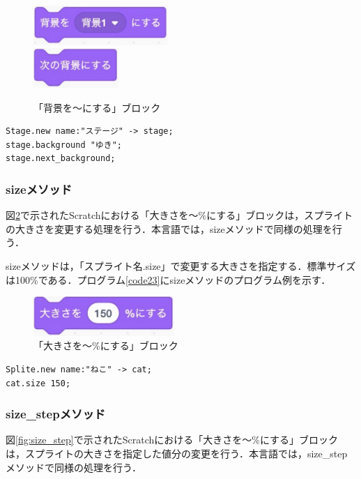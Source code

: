 \documentclass[10pt,a4j]{ltjsarticle}
\begin{document}
\begin{figure}[H]
  \centering
  \includegraphics[height=15mm]{images/set.pdf} \\
  \includegraphics[height=15mm]{images/next_set.pdf} 
  \caption{「背景を〜にする」ブロック}
  \label{fig:background}
\end{figure}

\begin{lstlisting}[caption=backgroundメソッドとnext\_backgroundメソッドのプログラム例, label=code22]
Stage.new name:"ステージ" -> stage;
stage.background "ゆき";
stage.next_background;
\end{lstlisting}

\subsubsection{sizeメソッド}
図\ref{fig:size}で示されたScratchにおける「大きさを〜\%にする」ブロックは，スプライトの大きさを変更する処理を行う．本言語では，sizeメソッドで同様の処理を行う．

sizeメソッドは，「スプライト名.size」で変更する大きさを指定する．標準サイズは100\%である．プログラム\ref{code23}にsizeメソッドのプログラム例を示す．

\begin{figure}[H]
  \centering
  \includegraphics[height=15mm]{images/size.pdf}
  \caption{「大きさを〜\%にする」ブロック}
  \label{fig:size}
\end{figure}

\begin{lstlisting}[caption=sizeメソッドのプログラム例, label=code23]
Splite.new name:"ねこ" -> cat;
cat.size 150;
\end{lstlisting}

\subsubsection{size\_stepメソッド}
図\ref{fig:size_step}で示されたScratchにおける「大きさを〜\%にする」ブロックは，スプライトの大きさを指定した値分の変更を行う．本言語では，size\_stepメソッドで同様の処理を行う．
\end{document}

